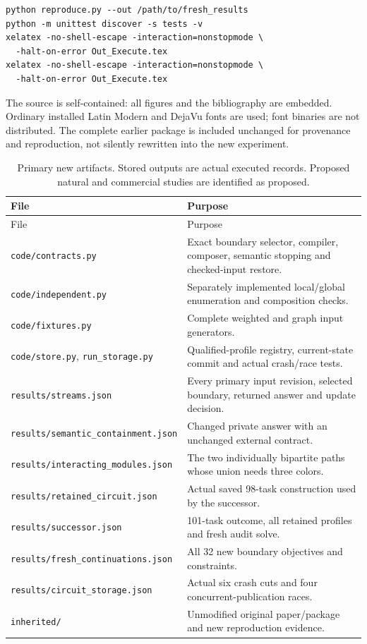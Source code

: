 \documentclass[11pt,letterpaper]{article}
\theoremstyle{definition}\newtheorem{definition}[theorem]{Definition}
\theoremstyle{remark}\newtheorem{remark}[theorem]{Remark}
\begin{document}
\begin{verbatim}
python reproduce.py --out /path/to/fresh_results
python -m unittest discover -s tests -v
xelatex -no-shell-escape -interaction=nonstopmode \
  -halt-on-error Out_Execute.tex
xelatex -no-shell-escape -interaction=nonstopmode \
  -halt-on-error Out_Execute.tex
\end{verbatim}

The source is self-contained: all figures and the bibliography are embedded. Ordinary installed Latin Modern and DejaVu fonts are used; font binaries are not distributed. The complete earlier package is included unchanged for provenance and reproduction, not silently rewritten into the new experiment.

\begingroup\small
\begin{longtable}{@{}P{.43\linewidth}P{.52\linewidth}@{}}
\caption{Primary new artifacts. Stored outputs are actual executed records. Proposed natural and commercial studies are identified as proposed.}\\
\toprule File & Purpose\\\midrule\endfirsthead
\toprule File & Purpose\\\midrule\endhead

\texttt{code/contracts.py} & Exact boundary selector, compiler, composer, semantic stopping and checked-input restore.\\
\texttt{code/independent.py} & Separately implemented local/global enumeration and composition checks.\\
\texttt{code/fixtures.py} & Complete weighted and graph input generators.\\
\texttt{code/store.py}, \texttt{run\_storage.py} & Qualified-profile registry, current-state commit and actual crash/race tests.\\
\texttt{results/streams.json} & Every primary input revision, selected boundary, returned answer and update decision.\\
\texttt{results/semantic\_containment.json} & Changed private answer with an unchanged external contract.\\
\texttt{results/interacting\_modules.json} & The two individually bipartite paths whose union needs three colors.\\
\texttt{results/retained\_circuit.json} & Actual saved 98-task construction used by the successor.\\
\texttt{results/successor.json} & 101-task outcome, all retained profiles and fresh audit solve.\\
\texttt{results/fresh\_continuations.json} & All 32 new boundary objectives and constraints.\\
\texttt{results/circuit\_storage.json} & Actual six crash cuts and four concurrent-publication races.\\
\texttt{inherited/} & Unmodified original paper/package and new reproduction evidence.\\\bottomrule
\end{longtable}
\endgroup
\end{document}
